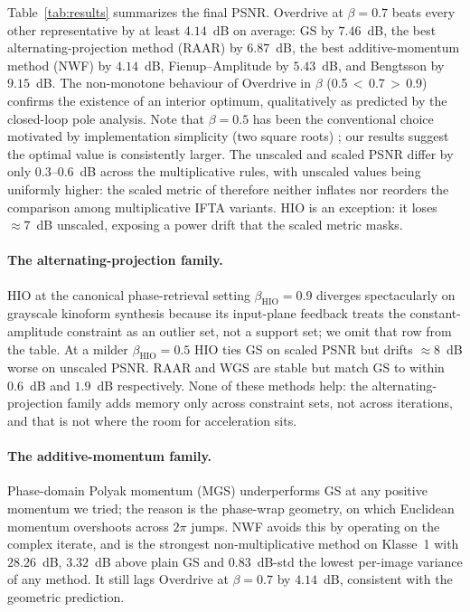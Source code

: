 \documentclass[11pt,a4paper]{article}
\begin{document}
Table~\ref{tab:results} summarizes the final PSNR. Overdrive at $\beta=0.7$
beats every other representative by at least $4.14$~dB on average: GS by
$7.46$~dB, the best alternating-projection method (RAAR) by $6.87$~dB, the
best additive-momentum method (NWF) by $4.14$~dB, Fienup--Amplitude by
$5.43$~dB, and Bengtsson by $9.15$~dB. The non-monotone behaviour of
Overdrive in $\beta$ (0.5\,$<$\,0.7\,$>$\,0.9) confirms the existence of an
interior optimum, qualitatively as predicted by the closed-loop pole
analysis. Note that $\beta=0.5$ has been the conventional choice motivated
by implementation simplicity (two square roots) \cite{Bernau2012}; our
results suggest the optimal value is consistently larger. The unscaled and
scaled PSNR differ by only $0.3$--$0.6$~dB across the multiplicative rules,
with unscaled values being uniformly higher: the scaled metric of
\cite{Bernau2012} therefore neither inflates nor reorders the comparison
among multiplicative IFTA variants. HIO is an exception: it loses
$\approx 7$~dB unscaled, exposing a power drift that the scaled metric
masks.

\paragraph{The alternating-projection family.} HIO at the canonical
phase-retrieval setting $\beta_{\mathrm{HIO}}=0.9$ diverges spectacularly on
grayscale kinoform synthesis because its input-plane feedback treats the
constant-amplitude constraint as an outlier set, not a support set; we
omit that row from the table. At a milder $\beta_{\mathrm{HIO}}=0.5$ HIO
ties GS on scaled PSNR but drifts $\approx 8$~dB worse on unscaled PSNR.
RAAR and WGS are stable but match GS to within $0.6$~dB and $1.9$~dB
respectively. None of these methods help: the alternating-projection
family adds memory only across constraint sets, not across iterations, and
that is not where the room for acceleration sits.

\paragraph{The additive-momentum family.} Phase-domain Polyak momentum
(MGS) underperforms GS at any positive momentum we tried; the reason is
the phase-wrap geometry, on which Euclidean momentum overshoots across
$2\pi$ jumps. NWF avoids this by operating on the complex iterate, and
is the strongest non-multiplicative method on Klasse~1 with $28.26$~dB,
$3.32$~dB above plain GS and $0.83$~dB-std the lowest per-image variance
of any method. It still lags Overdrive at $\beta=0.7$ by $4.14$~dB,
consistent with the geometric prediction.
\end{document}
